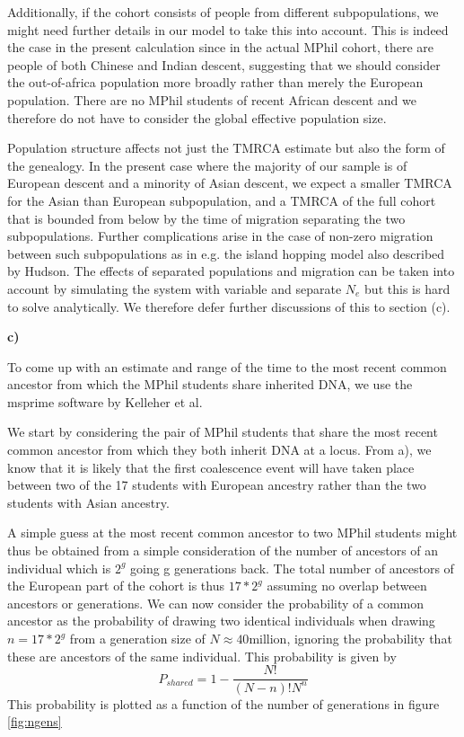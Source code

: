 \documentclass{article}
\begin{document}
Additionally, if the cohort consists of people from different subpopulations, we might need further details in our model to take this into account. This is indeed the case in the present calculation since in the actual MPhil cohort, there are people of both Chinese and Indian descent, suggesting that we should consider the out-of-africa population more broadly rather than merely the European population. There are no MPhil students of recent African descent and we therefore do not have to consider the global effective population size.

Population structure affects not just the TMRCA estimate but also the form of the genealogy. In the present case where the majority of our sample is of European descent and a minority of Asian descent, we expect a smaller TMRCA for the Asian than European subpopulation, and a TMRCA of the full cohort that is bounded from below by the time of migration separating the two subpopulations. Further complications arise in the case of non-zero migration between such subpopulations as in e.g. the island hopping model also described by Hudson. The effects of separated populations and migration can be taken into account by simulating the system with variable and separate $N_e$ but this is hard to solve analytically. We therefore defer further discussions of this to section (c).

\textbf{c)}%

To come up with an estimate and range of the time to the most recent common ancestor from which the MPhil students share inherited DNA, we use the msprime software by Kelleher et al.

We start by considering the pair of MPhil students that share the most recent common ancestor from which they both inherit DNA at a locus. From a), we know that it is likely that the first coalescence event will have taken place between two of the 17 students with European ancestry rather than the two students with Asian ancestry.

A simple guess at the most recent common ancestor to two MPhil students might thus be obtained from a simple consideration of the number of ancestors of an individual which is $2^g$ going g generations back.
The total number of ancestors of the European part of the cohort is thus $17*2^g$ assuming no overlap between ancestors or generations. We can now consider the probability of a common ancestor as the probability of drawing two identical individuals when drawing $n = 17*2^g$ from a generation size of $N \approx 40$million, ignoring the probability that these are ancestors of the same individual. This probability is given by
\begin{equation}
P_{shared} = 1 - \dfrac{N!}{(N-n)!N^n}
\end{equation}
This probability is plotted as a function of the number of generations in figure \ref{fig:ngens}
\end{document}
